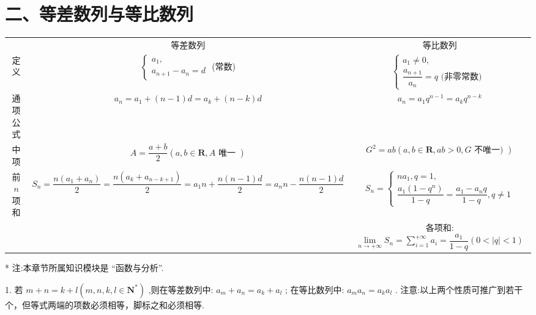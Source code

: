 \section*{二、等差数列与等比数列}

\begin{center}
\begin{tabular}{|c|c|c|}
\hline
\phantom{X} & 等差数列 & 等比数列 \\
\cline{1-3}
定义 & $\left\{  \begin{array}{l} {a}_{1}, \\  {a}_{n + 1} - {a}_{n} = d \end{array}\right.$ (常数) & $\left\{  \begin{array}{l} {a}_{1} \neq  0, \\  \dfrac{{a}_{n + 1}}{{a}_{n}} = q\text{ (非零常数) } \end{array}\right.$ \\
\cline{1-3}
通项公式 & ${a}_{n} = {a}_{1} + \left( {n - 1}\right) d = {a}_{k} + \left( {n - k}\right) d$ & ${a}_{n} = {a}_{1}{q}^{n - 1} = {a}_{k}{q}^{n - k}$ \\
\cline{1-3}
中项 & $A = \dfrac{a + b}{2}\left( {a,b \in  \mathbf{R},A\text{ 唯一 }}\right)$ & ${G}^{2} = {ab}\left( {a,b \in  \mathbf{R},{ab} > 0,G\text{ 不唯一) }}\right)$ \\
\cline{1-3}
前 $n$ 项和 & ${S}_{n} = \dfrac{n\left( {{a}_{1} + {a}_{n}}\right) }{2} = \dfrac{n\left( {{a}_{k} + {a}_{n - k + 1}}\right) }{2}  = {a}_{1}n + \dfrac{n\left( {n - 1}\right) d}{2} = {a}_{n}n - \dfrac{n\left( {n - 1}\right) d}{2}$ & ${S}_{n} = \left\{  \begin{array}{l} n{a}_{1},q = 1, \\  \dfrac{{a}_{1}\left( {1 - {q}^{n}}\right) }{1 - q} = \dfrac{{a}_{1} - {a}_{n}q}{1 - q},q \neq  1 \end{array}\right.$ \\
\cline{1-3}
\phantom{X} & \phantom{X} & 各项和: $\mathop{\lim }\limits_{{n \rightarrow   + \infty }}{S}_{n} = \mathop{\sum }\limits_{{i = 1}}^{{+\infty }}{a}_{i} = \dfrac{{a}_{1}}{1 - q}\left( {0 < \left| q\right|  < 1}\right)$ \\
\cline{1-3}
\hline
\end{tabular}
\end{center}



* 注:本章节所属知识模块是 “函数与分析”.



1. 若 $m + n = k + l\left( {m,n,k,l \in  {\mathbf{N}}^{ * }}\right)$ ,则在等差数列中: ${a}_{m} + {a}_{n} = {a}_{k} + {a}_{l}$ ; 在等比数列中: ${a}_{m}{a}_{n} = {a}_{k}{a}_{l}$ . 注意:以上两个性质可推广到若干个，但等式两端的项数必须相等，脚标之和必须相等.

